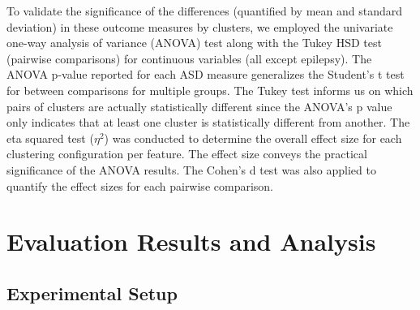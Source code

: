 \documentclass{bmcart}
\begin{document}
To validate the significance of the differences (quantified by mean and standard deviation) in these outcome measures by clusters, we employed the univariate one-way analysis of variance (ANOVA) test along with the Tukey HSD test (pairwise comparisons) for continuous variables (all except epilepsy). The ANOVA p-value reported for each ASD measure generalizes the Student’s t test for between
comparisons for multiple groups. The Tukey test informs us on which pairs of clusters are actually statistically different since the ANOVA’s p value only indicates that at
least one cluster is statistically different from another. 
The eta squared test ($\eta^2$) was conducted to determine the overall effect size for each clustering configuration per feature. The effect size conveys the practical significance of the ANOVA results. The Cohen’s d test was also applied to quantify the effect sizes for each pairwise comparison.

\section*{Evaluation Results and Analysis}

\subsection*{Experimental Setup}
\end{document}
